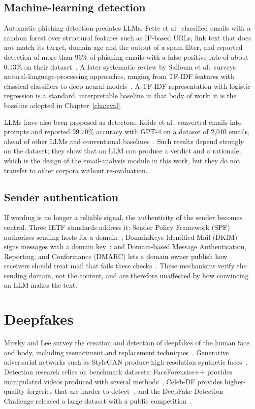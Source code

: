 \subsection{Machine-learning detection}
Automatic phishing detection predates LLMs. Fette et al.\ classified emails with a random forest over structural features such as IP-based URLs, link text that does not match its target, domain age and the output of a spam filter, and reported detection of more than 96\% of phishing emails with a false-positive rate of about 0.13\% on their dataset~\cite{fette2007learning}. A later systematic review by Salloum et al.\ surveys natural-language-processing approaches, ranging from TF-IDF features with classical classifiers to deep neural models~\cite{salloum2022phishing}. A TF-IDF representation with logistic regression is a standard, interpretable baseline in that body of work; it is the baseline adopted in Chapter~\ref{cha:eval}.

LLMs have also been proposed as detectors. Koide et al.\ converted emails into prompts and reported 99.70\% accuracy with GPT-4 on a dataset of 2{,}010 emails, ahead of other LLMs and conventional baselines~\cite{koide2024chatspamdetector}. Such results depend strongly on the dataset; they show that an LLM can produce a verdict and a rationale, which is the design of the email-analysis module in this work, but they do not transfer to other corpora without re-evaluation.

\subsection{Sender authentication}
If wording is no longer a reliable signal, the authenticity of the sender becomes central. Three IETF standards address it: Sender Policy Framework (SPF) authorises sending hosts for a domain~\cite{rfc7208}; DomainKeys Identified Mail (DKIM) signs messages with a domain key~\cite{rfc6376}; and Domain-based Message Authentication, Reporting, and Conformance (DMARC) lets a domain owner publish how receivers should treat mail that fails these checks~\cite{rfc9989}. These mechanisms verify the sending domain, not the content, and are therefore unaffected by how convincing an LLM makes the text.

\section{Deepfakes}
\label{sec:sota-df}

Mirsky and Lee survey the creation and detection of deepfakes of the human face and body, including reenactment and replacement techniques~\cite{mirsky2021deepfake}. Generative adversarial networks such as StyleGAN produce high-resolution synthetic faces~\cite{karras2019stylegan}. Detection research relies on benchmark datasets: FaceForensics++ provides manipulated videos produced with several methods~\cite{rossler2019faceforensics}, Celeb-DF provides higher-quality forgeries that are harder to detect~\cite{li2020celebdf}, and the DeepFake Detection Challenge released a large dataset with a public competition~\cite{dolhansky2020dfdc}.


